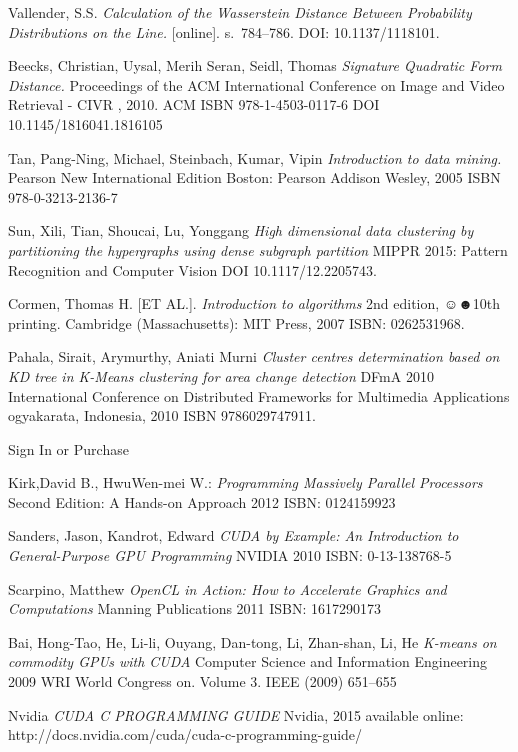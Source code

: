 \begin{thebibliography}{99}
{\sc Vallender,} S.S.
\emph{Calculation of the Wasserstein Distance Between Probability Distributions on the Line.}
[online]. s.~784--786. DOI: 10.1137/1118101.

{\sc Beecks,} Christian, {\sc Uysal,} Merih Seran, {\sc Seidl,} Thomas
\emph{Signature Quadratic Form Distance.}
Proceedings of the ACM International Conference on Image and Video Retrieval - CIVR , 2010.
ACM
ISBN 978-1-4503-0117-6
DOI 10.1145/1816041.1816105

{\sc Tan,} Pang-Ning, {\sc Michael,} Steinbach, {\sc Kumar,} Vipin
\emph{Introduction to data mining.}
Pearson New International Edition
Boston: Pearson Addison Wesley, 2005
ISBN 978-0-3213-2136-7

{\sc Sun,} Xili, {\sc Tian,} Shoucai, {\sc Lu,} Yonggang
\emph{High dimensional data clustering by partitioning the hypergraphs using dense subgraph partition}
MIPPR 2015: Pattern Recognition and Computer Vision
DOI 10.1117/12.2205743.

{\sc Cormen,} Thomas H. [ET AL.].
\emph{Introduction to algorithms}
2nd edition, ☺☻10th printing.
Cambridge (Massachusetts): MIT Press, 2007 
ISBN: 0262531968.

{\sc Pahala,} Sirait, {\sc Arymurthy,} Aniati Murni
\emph{Cluster centres determination based on KD tree in K-Means clustering for area change detection}
DFmA 2010 International Conference on Distributed Frameworks for Multimedia Applications
ogyakarata, Indonesia, 2010 
ISBN 9786029747911.



Sign In or Purchase

{\sc Kirk,}David B., {\sc Hwu}Wen-mei W.:
\emph{Programming Massively Parallel Processors}
Second Edition: A Hands-on Approach
2012
ISBN: 0124159923 

{\sc Sanders,} Jason, {\sc Kandrot,} Edward
\emph{CUDA by Example: An Introduction to General-Purpose GPU Programming}
NVIDIA
2010
ISBN: 0-13-138768-5 

{\sc Scarpino,} Matthew
\emph{OpenCL in Action: How to Accelerate Graphics and Computations}
Manning Publications
2011
ISBN: 1617290173 

{\sc Bai,} Hong-Tao, {\sc He,} Li-li, {\sc Ouyang,} Dan-tong, {\sc Li,} Zhan-shan, {\sc Li, } He
\emph{K-means on commodity GPUs with CUDA}
 Computer Science and Information Engineering
 2009
 WRI World Congress on. Volume 3.
 IEEE (2009) 651–655 

Nvidia
\emph{CUDA C PROGRAMMING GUIDE}
Nvidia, 2015
available online: http://docs.nvidia.com/cuda/cuda-c-programming-guide/
\end{thebibliography}